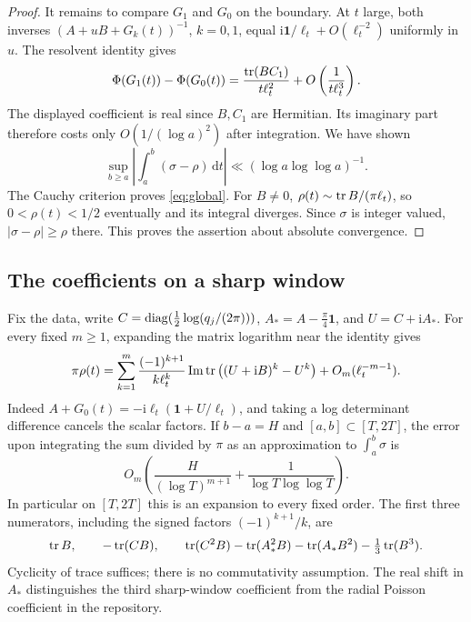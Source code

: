 \documentclass[11pt]{article}
\newcommand{\dd}{\,\mathrm d}\newcommand{\ii}{\mathrm i}
\newcommand{\Imn}{\operatorname{Im}}\newcommand{\Ren}{\operatorname{Re}}
\newcommand{\id}{\mathbf1}\newcommand{\norm}[1]{\left\lVert#1\right\rVert}
\newcommand{\ph}{\Phi}\newcommand{\Gm}{G_0}
\begin{document}
\begin{proof}
It remains to compare $G_1$ and $\Gm$ on the boundary. At $t$ large, both inverses $(A+uB+G_k(t))^{-1}$, $k=0,1$, equal $\ii\id/\ell_t+O(\ell_t^{-2})$ uniformly in $u$. The resolvent identity gives
\[
 \ph(G_1(t))-\ph(\Gm(t))
  =\frac{\tr(BC_1)}{t\ell_t^2}
      +O\left(\frac1{t\ell_t^3}\right).
\]
The displayed coefficient is real since $B,C_1$ are Hermitian. Its imaginary part therefore costs only $O(1/(\log a)^2)$ after integration. We have shown
\[
 \sup_{b\ge a}\left|\int_a^b(\sigma-\rho)\dd t\right|
     \ll (\log a\log\log a)^{-1}.
\]
The Cauchy criterion proves \eqref{eq:global}. For $B\ne0$, $\rho(t)\sim\operatorname{tr} B/(\pi\ell_t)$, so $0<\rho(t)<1/2$ eventually and its integral diverges. Since $\sigma$ is integer valued, $|\sigma-\rho|\ge\rho$ there. This proves the assertion about absolute convergence.
\end{proof}

\subsection{The coefficients on a sharp window}
Fix the data, write $C=\operatorname{diag}(\tfrac12\log(q_j/(2\pi)))$, $A_*=A-\tfrac\pi4\id$, and $U=C+\ii A_*$. For every fixed $m\ge1$, expanding the matrix logarithm near the identity gives
\begin{equation}\label{eq:expand}
 \pi\rho(t)=\sum_{k=1}^m\frac{(-1)^{k+1}}{k\ell_t^k}
  \Imn\tr\big((U+\ii B)^k-U^k\big)+O_m(\ell_t^{-m-1}).
\end{equation}
Indeed $A+G_0(t)=-\ii\ell_t(\id+U/\ell_t)$, and taking a log determinant difference cancels the scalar factors. If $b-a=H$ and $[a,b]\subset[T,2T]$, the error upon integrating the sum divided by $\pi$ as an approximation to $\int_a^b\sigma$ is
\[
 O_m\left(\frac{H}{(\log T)^{m+1}}+\frac{1}{\log T\log\log T}\right).
\]
In particular on $[T,2T]$ this is an expansion to every fixed order. The first three numerators, including the signed factors $(-1)^{k+1}/k$, are
\[
 \operatorname{tr} B,\qquad -\operatorname{tr}(CB),\qquad
 \operatorname{tr}(C^2B)-\operatorname{tr}(A_*^2B)-\operatorname{tr}(A_*B^2)-\tfrac13\operatorname{tr}(B^3).
\]
Cyclicity of trace suffices; there is no commutativity assumption. The real shift in $A_*$ distinguishes the third sharp-window coefficient from the radial Poisson coefficient in the repository.
\end{document}
